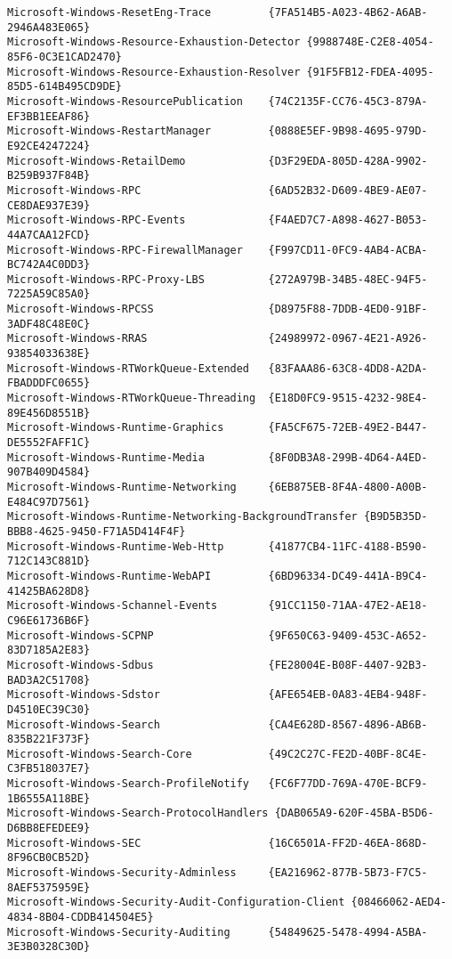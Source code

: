 \documentclass{report}
\begin{document}
\begin{lstlisting}[breaklines=true,basicstyle=\tiny]
Microsoft-Windows-ResetEng-Trace         {7FA514B5-A023-4B62-A6AB-2946A483E065}
Microsoft-Windows-Resource-Exhaustion-Detector {9988748E-C2E8-4054-85F6-0C3E1CAD2470}
Microsoft-Windows-Resource-Exhaustion-Resolver {91F5FB12-FDEA-4095-85D5-614B495CD9DE}
Microsoft-Windows-ResourcePublication    {74C2135F-CC76-45C3-879A-EF3BB1EEAF86}
Microsoft-Windows-RestartManager         {0888E5EF-9B98-4695-979D-E92CE4247224}
Microsoft-Windows-RetailDemo             {D3F29EDA-805D-428A-9902-B259B937F84B}
Microsoft-Windows-RPC                    {6AD52B32-D609-4BE9-AE07-CE8DAE937E39}
Microsoft-Windows-RPC-Events             {F4AED7C7-A898-4627-B053-44A7CAA12FCD}
Microsoft-Windows-RPC-FirewallManager    {F997CD11-0FC9-4AB4-ACBA-BC742A4C0DD3}
Microsoft-Windows-RPC-Proxy-LBS          {272A979B-34B5-48EC-94F5-7225A59C85A0}
Microsoft-Windows-RPCSS                  {D8975F88-7DDB-4ED0-91BF-3ADF48C48E0C}
Microsoft-Windows-RRAS                   {24989972-0967-4E21-A926-93854033638E}
Microsoft-Windows-RTWorkQueue-Extended   {83FAAA86-63C8-4DD8-A2DA-FBADDDFC0655}
Microsoft-Windows-RTWorkQueue-Threading  {E18D0FC9-9515-4232-98E4-89E456D8551B}
Microsoft-Windows-Runtime-Graphics       {FA5CF675-72EB-49E2-B447-DE5552FAFF1C}
Microsoft-Windows-Runtime-Media          {8F0DB3A8-299B-4D64-A4ED-907B409D4584}
Microsoft-Windows-Runtime-Networking     {6EB875EB-8F4A-4800-A00B-E484C97D7561}
Microsoft-Windows-Runtime-Networking-BackgroundTransfer {B9D5B35D-BBB8-4625-9450-F71A5D414F4F}
Microsoft-Windows-Runtime-Web-Http       {41877CB4-11FC-4188-B590-712C143C881D}
Microsoft-Windows-Runtime-WebAPI         {6BD96334-DC49-441A-B9C4-41425BA628D8}
Microsoft-Windows-Schannel-Events        {91CC1150-71AA-47E2-AE18-C96E61736B6F}
Microsoft-Windows-SCPNP                  {9F650C63-9409-453C-A652-83D7185A2E83}
Microsoft-Windows-Sdbus                  {FE28004E-B08F-4407-92B3-BAD3A2C51708}
Microsoft-Windows-Sdstor                 {AFE654EB-0A83-4EB4-948F-D4510EC39C30}
Microsoft-Windows-Search                 {CA4E628D-8567-4896-AB6B-835B221F373F}
Microsoft-Windows-Search-Core            {49C2C27C-FE2D-40BF-8C4E-C3FB518037E7}
Microsoft-Windows-Search-ProfileNotify   {FC6F77DD-769A-470E-BCF9-1B6555A118BE}
Microsoft-Windows-Search-ProtocolHandlers {DAB065A9-620F-45BA-B5D6-D6BB8EFEDEE9}
Microsoft-Windows-SEC                    {16C6501A-FF2D-46EA-868D-8F96CB0CB52D}
Microsoft-Windows-Security-Adminless     {EA216962-877B-5B73-F7C5-8AEF5375959E}
Microsoft-Windows-Security-Audit-Configuration-Client {08466062-AED4-4834-8B04-CDDB414504E5}
Microsoft-Windows-Security-Auditing      {54849625-5478-4994-A5BA-3E3B0328C30D}

\end{lstlisting}
\end{document}
